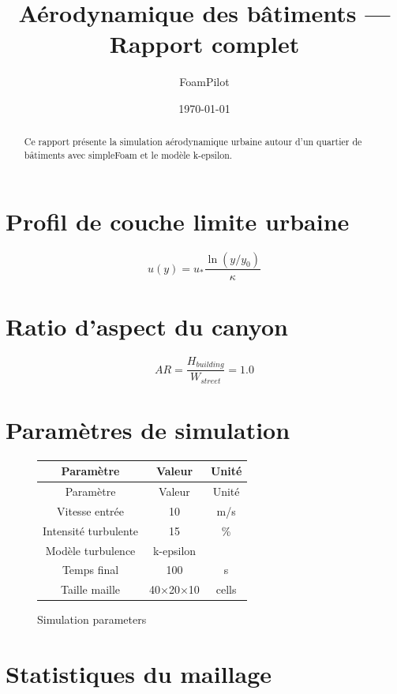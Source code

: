 \documentclass{article}%
\title{Aérodynamique des bâtiments — Rapport complet}%
\author{FoamPilot}%
\date{\today}%
\begin{document}
%
\normalsize%
\maketitle%
\tableofcontents%
\begin{abstract}%
Ce rapport présente la simulation aérodynamique urbaine autour d'un quartier de bâtiments avec simpleFoam et le modèle k{-}epsilon.%
\end{abstract}%
\section{Profil de couche limite urbaine}%
\label{sec:Profildecouchelimiteurbaine}%

%
\[%
u(y) = u_* \frac{\ln(y / y_0)}{\kappa}%
\]%
\section{Ratio d'aspect du canyon}%
\label{sec:Ratiodaspectducanyon}%

%
\[%
AR = \frac{H_{building}}{W_{street}} = 1.0%
\]%
\section{Paramètres de simulation}%
\label{sec:Paramtresdesimulation}%

%


\begin{figure}[h!]%
\begin{tabular}{|c|c|c|}%
\hline%
Paramètre&Valeur&Unité\\%
\hline%
Paramètre&Valeur&Unité\\%
\hline%
Vitesse entrée&10&m/s\\%
\hline%
Intensité turbulente&15&\%\\%
\hline%
Modèle turbulence&k{-}epsilon&\\%
\hline%
Temps final&100&s\\%
\hline%
Taille maille&40×20×10&cells\\%
\hline%
\end{tabular}%
\caption{Simulation parameters}%
\end{figure}

%
\section{Statistiques du maillage}%
\label{sec:Statistiquesdumaillage}%

%
\end{document}
